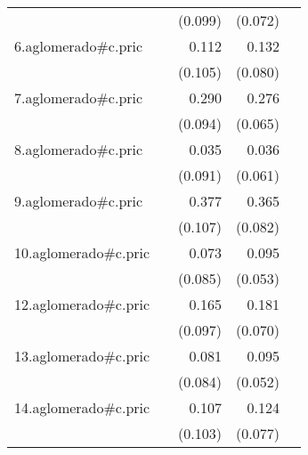 {\begin{longtable}{l*{4}{D{.}{.}{-1}}}
            &                     &     (0.099)         &     (0.072)         &                     \\
\addlinespace
6.aglomerado#c.pric&                     &       0.112         &       0.132         &                     \\
            &                     &     (0.105)         &     (0.080)         &                     \\
\addlinespace
7.aglomerado#c.pric&                     &       0.290\sym{**} &       0.276\sym{***}&                     \\
            &                     &     (0.094)         &     (0.065)         &                     \\
\addlinespace
8.aglomerado#c.pric&                     &       0.035         &       0.036         &                     \\
            &                     &     (0.091)         &     (0.061)         &                     \\
\addlinespace
9.aglomerado#c.pric&                     &       0.377\sym{***}&       0.365\sym{***}&                     \\
            &                     &     (0.107)         &     (0.082)         &                     \\
\addlinespace
10.aglomerado#c.pric&                     &       0.073         &       0.095         &                     \\
            &                     &     (0.085)         &     (0.053)         &                     \\
\addlinespace
12.aglomerado#c.pric&                     &       0.165         &       0.181\sym{*}  &                     \\
            &                     &     (0.097)         &     (0.070)         &                     \\
\addlinespace
13.aglomerado#c.pric&                     &       0.081         &       0.095         &                     \\
            &                     &     (0.084)         &     (0.052)         &                     \\
\addlinespace
14.aglomerado#c.pric&                     &       0.107         &       0.124         &                     \\
            &                     &     (0.103)         &     (0.077)         &                     \\

\end{longtable}}
